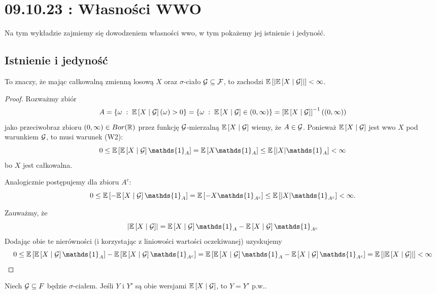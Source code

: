 \section{09.10.23 : Własności WWO}

Na tym wykładzie zajmiemy się dowodzeniem własności wwo, w tym pokażemy jej istnienie i jedyność.

\subsection{Istnienie i jedyność}

\begin{lemma}
  To znaczy, że mając całkowalną zmienną losową $X$ oraz $\sigma$-ciało $\mathcal{G}\subseteq\mathcal{F}$, to zachodzi $\expected{\left|\expected{X}{\set{G}}\right|}<\infty$.
\end{lemma}

\begin{proof}
  Rozważmy zbiór
  $$A=\{\omega\;:\;\expected{X}{\set{G}}(\omega)>0\}=\{\omega\;:\;\expected{X}{\set{G}}\in(0, \infty)\}=\left[\expected{X}{\set{G}}\right]^{-1}((0,\infty))$$
  jako przeciwobraz zbioru $(0,\infty)\in Bor(\operatorname{\mathbb{R}})$ przez funkcję $\mathcal{G}$-mierzalną $\expected{X}{\set{G}}$ wiemy, że $A\in \mathcal{G}$. Ponieważ $\expected{X}{\set{G}}$ jest wwo $X$ pod warunkiem $\mathcal{G}$, to musi warunek (W2): $$0\leq\expected{\expected{X}{\set{G}}\mathds{1}_A}=\expected{X\mathds{1}_A}\leq\expected{|X|\mathds{1}_A}<\infty$$
  bo $X$ jest całkowalna.

  Analogicznie postępujemy dla zbioru $A^c$:
  $$0\leq\expected{-\expected{X}{\set{G}}\mathds{1}_A}=\expected{-X\mathds{1}_{A^c}}\leq\expected{|X|\mathds{1}_{A^c}}<\infty.$$
  
  Zauważmy, że 
  $$\left|
    \expected{X}{\set{G}}
    \right| = \expected{X}{\set{G}}\mathds{1}_A-\expected{X}{\set{G}}\mathds{1}_{A^c}$$
  Dodając obie te nierówności (i korzystając z liniowości wartości oczekiwanej) uzyskujemy
  $$0\leq \expected{\expected{X}{\set{G}}\mathds{1}_A}-\expected{\expected{X}{\set{G}}\mathds{1}_{A^c}}=\expected{\expected{X}{\set{G}}\mathds{1}_A-\expected{X}{\set{G}}\mathds{1}_{A^c}}=\expected{\left|\expected{X}{\set{G}}\right|}<\infty$$
\end{proof}

\begin{lemma}[jedyność p.w.]
  Niech $\mathcal{G}\subseteq{F}$ będzie $\sigma$-ciałem. Jeśli $Y$ i $Y'$ są obie wersjami $\expected{X}{\set{G}}$, to $Y=Y'$ p.w..
\end{lemma}

